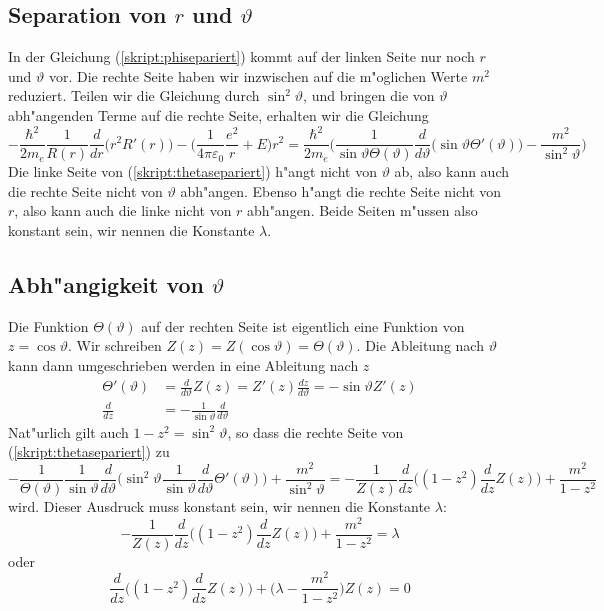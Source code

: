 \subsection{Separation von $r$ und $\vartheta$}
In der Gleichung (\ref{skript:phisepariert}) kommt auf der linken Seite nur
noch $r$ und $\vartheta$ vor.  Die rechte Seite haben wir inzwischen auf
die m"oglichen Werte $m^2$ reduziert. Teilen wir die Gleichung durch
$\sin^2\vartheta$, und bringen die von $\vartheta$ abh"angenden Terme
auf die rechte Seite, erhalten wir die Gleichung
\begin{equation}
-\frac{\hbar^2}{2m_e}
\frac{1}{R(r)}\frac{d}{dr}\bigl(r^2R'(r)\bigr)
-\biggl(\frac{1}{4\pi\varepsilon_0}\frac{e^2}{r}
+
E
\biggr)r^2
=
\frac{\hbar^2}{2m_e}
\biggl(
\frac1{\sin\vartheta\Theta(\vartheta) }
\frac{d}{d\vartheta}\bigl(\sin\vartheta \Theta'(\vartheta)\bigr)
-
\frac{m^2}{\sin^2\vartheta}
\biggr)
\label{skript:thetasepariert}
\end{equation}
Die linke Seite von (\ref{skript:thetasepariert}) h"angt nicht von $\vartheta$
ab, also kann auch die rechte Seite nicht von $\vartheta$ abh"angen.
Ebenso h"angt die rechte Seite nicht von $r$, also kann auch die linke
nicht von $r$ abh"angen. Beide Seiten m"ussen also konstant sein,
wir nennen die Konstante $\lambda$.

\subsection{Abh"angigkeit von $\vartheta$}
Die Funktion $\Theta(\vartheta)$ auf der rechten Seite ist eigentlich
eine Funktion von $z=\cos\vartheta$. Wir schreiben
$Z(z)=Z(\cos\vartheta)=\Theta(\vartheta)$. Die Ableitung nach $\vartheta$
kann dann umgeschrieben werden in eine Ableitung nach $z$
\begin{align*}
\Theta'(\vartheta)&=
\frac{d}{d\vartheta}Z(z)=Z'(z)\frac{dz}{d\vartheta}=-\sin\vartheta Z'(z)
\\
\frac{d}{dz}
&=
-\frac1{\sin\vartheta}\frac{d}{d\vartheta}
\end{align*}
Nat"urlich gilt auch $1-z^2=\sin^2\vartheta$, so dass die rechte Seite
von (\ref{skript:thetasepariert}) zu
\begin{equation}
-
\frac1{\Theta(\vartheta)}
\frac1{\sin\vartheta}
\frac{d}{d\vartheta}\biggl(
\sin^2\vartheta \frac1{\sin\vartheta}\frac{d}{d\vartheta}\Theta'(\vartheta)
\biggr)
+
\frac{m^2}{\sin^2\vartheta}
=
-\frac1{Z(z)}\frac{d}{dz}\biggl(
(1-z^2)\frac{d}{dz}Z(z)
\biggr)
+
\frac{m^2}{1-z^2}
\end{equation}
wird. Dieser Ausdruck muss konstant sein, wir nennen die Konstante 
$\lambda$:
\begin{equation}
-\frac1{Z(z)}\frac{d}{dz}\biggl(
(1-z^2)\frac{d}{dz}Z(z)
\biggr)
+
\frac{m^2}{1-z^2}
=\lambda
\end{equation}
oder
\begin{equation}
\frac{d}{dz}\biggl(
(1-z^2)\frac{d}{dz}Z(z)
\biggr)
+\biggl(\lambda
-
\frac{m^2}{1-z^2}
\biggr)Z(z)
=0
\label{skript:legendregleichung}
\end{equation}

